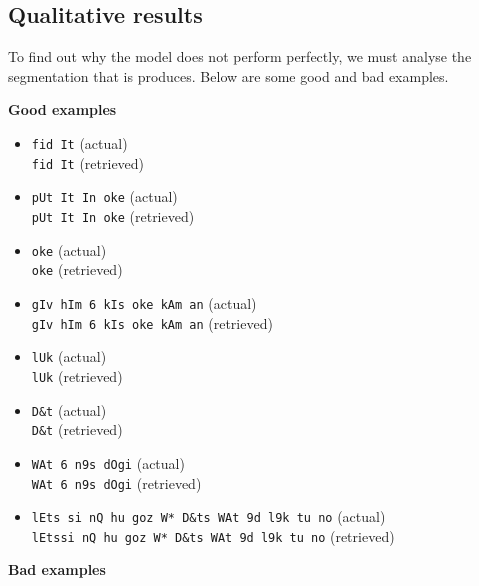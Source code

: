 
\subsection{Qualitative results}

To find out why the model does not perform perfectly, we must analyse the segmentation that is produces. Below are some good and bad examples.\\


\begin{multicols}{2}
\noindent\textbf{Good examples}

\begin{itemize}
\item \texttt{fid It} (actual)\\ \texttt{fid It} (retrieved)
\item \texttt{pUt It In oke} (actual)\\ \texttt{pUt It In oke} (retrieved)
\item \texttt{oke} (actual)\\ \texttt{oke} (retrieved)
\item \texttt{gIv hIm 6 kIs oke kAm an} (actual)\\ \texttt{gIv hIm 6 kIs oke kAm an} (retrieved)
\item \texttt{lUk} (actual)\\ \texttt{lUk} (retrieved)
\item \texttt{D\&t} (actual)\\ \texttt{D\&t} (retrieved)
\item \texttt{WAt 6 n9s dOgi} (actual)\\ \texttt{WAt 6 n9s dOgi} (retrieved)
\item \texttt{lEts si nQ hu goz W* D\&ts WAt 9d l9k tu no} (actual)\\ \texttt{lEtssi nQ hu goz W* D\&ts WAt 9d l9k tu no} (retrieved)
\end{itemize}
\vfill
\columnbreak
\noindent\textbf{Bad examples}


\end{multicols}
